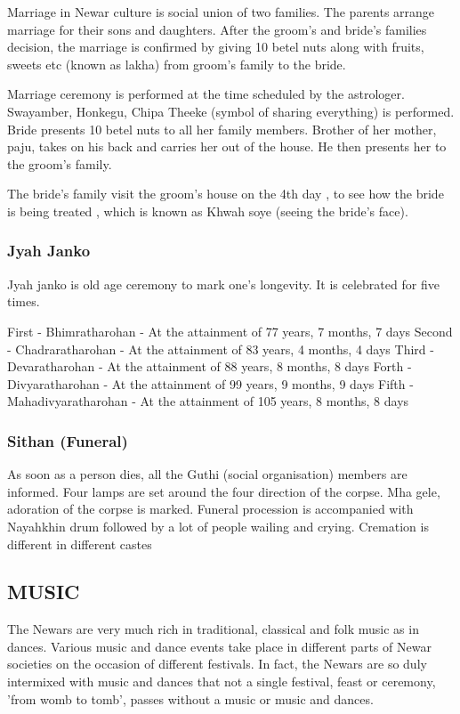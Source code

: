 \documentclass[a4paper,13pt, margin=0.9in]{article}
\begin{document}
\begin{flushleft}
Marriage in Newar culture is social union of two families. The parents arrange marriage for their sons and daughters. After the groom's and bride's families decision, the marriage is confirmed by giving 10 betel nuts along with fruits, sweets etc (known as lakha) from groom's family to the bride.

Marriage ceremony is performed at the time scheduled by the astrologer. Swayamber, Honkegu, Chipa Theeke (symbol of sharing everything) is performed. Bride presents 10 betel nuts to all her family members. Brother of her mother, paju, takes on his back and carries her out of the house. He then presents her to the groom's family.

The bride's family visit the groom's house on the 4th day , to see how the bride is being treated , which is known as Khwah soye (seeing the bride's face).

\subsubsection{Jyah Janko}

Jyah janko is old age ceremony to mark one's longevity. It is celebrated for five times.

First - Bhimratharohan - At the attainment of 77 years, 7 months, 7 days
Second - Chadraratharohan - At the attainment of 83 years, 4 months, 4 days
Third - Devaratharohan - At the attainment of 88 years, 8 months, 8 days
Forth - Divyaratharohan - At the attainment of 99 years, 9 months, 9 days
Fifth - Mahadivyaratharohan - At the attainment of 105 years, 8 months, 8 days

\subsubsection{Sithan (Funeral)}

As soon as a person dies, all the Guthi (social organisation) members are informed. Four lamps are set around the four direction of the corpse. Mha gele, adoration of the corpse is marked. Funeral procession is accompanied with Nayahkhin drum followed by a lot of people wailing and crying. Cremation is different in different castes


\newpage

	\subsection{MUSIC}
	The Newars are very much rich in traditional, classical and folk music as in dances. Various music and dance events take place in different parts of Newar societies on the occasion of different festivals. In fact, the Newars are so duly intermixed with music and dances that not a single festival, feast or ceremony, 'from womb to tomb', passes without a music or music and dances.


\end{flushleft}
\end{document}
